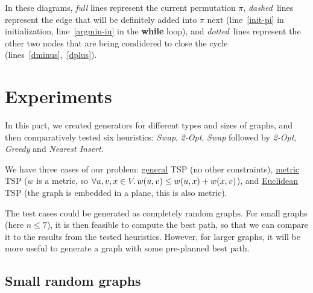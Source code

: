 \documentclass{article}
\newcommand{\R}{\mathbb{R}}
\newcommand{\bb}[1]{\textbf{#1}}
\newcommand{\uu}[1]{\underline{#1}}
\newcommand{\ii}[1]{\textit{#1}}
\newcommand{\py}[1]{\lstinline[language=Python]{#1}}
\begin{document}
In these diagrams, \ii{full} lines represent the current permutation $\pi$,
\ii{dashed}~lines represent the edge that will be definitely added into $\pi$ next
(line~\ref*{init-pi} in initialization, line~\ref*{argmin-iu} in the \bb{while} loop),
and \ii{dotted}~lines represent the other two nodes that are being condidered to close
the cycle (lines~\ref*{dminus},~\ref*{dplus}).

\section{Experiments}

In this part, we created generators for different types and sizes of graphs, and then
comparatively tested six heuristics: \ii{Swap}, \ii{2-Opt}, \ii{Swap} followed by
\ii{2-Opt}, \ii{Greedy} and \ii{Nearest Insert}.

We have three cases of our problem: \uu{general} TSP (no other constraints),
\uu{metric} TSP ($w$ is a metric, so
$\forall u,v,x\in V\ldotp w(u,v)\le w(u,x) + w(x,v)$), and \uu{Euclidean} TSP
(the graph is embedded in a plane, this is also metric).



The test cases could be generated as completely random graphs. For small graphs
(here $n\le 7$), it is then feasible to compute the best path, so that we can
compare it to the results from the tested heuristics. However, for larger graphs,
it will be more useful to generate a graph with some pre-planned best path.

\subsection{Small random graphs}
\end{document}
